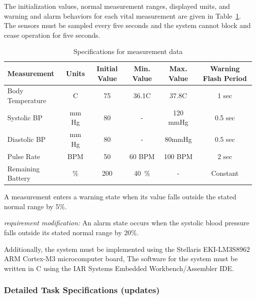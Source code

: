 \documentclass[12pt]{article} %
\begin{document}
The initialization values, normal measurement ranges, displayed units, and 
warning and alarm behaviors for each vital measurement are given in 
Table~\ref{tab:sensorDefs}. The sensors must be sampled every five seconds and the system cannot block and cease operation for five seconds.

\begin{table}[h]
  \centering
  \begin{tabular}{|l|*{5}{c}|}
    \hline
    Measurement & Units & Initial Value & Min. Value & Max. Value & Warning Flash Period \\ \hline
    Body Temperature & C & 75 & 36.1C & 37.8C & 1 sec \\ \hline
    Systolic BP & mm Hg & 80 & - & 120 mmHg & 0.5 sec \\ \hline
    Diastolic BP & mm Hg & 80 & - & 80mmHg & 0.5 sec \\ \hline
    Pulse Rate & BPM & 50 & 60 BPM & 100 BPM & 2 sec \\ \hline
    Remaining Battery & \% & 200 & 40~\% & - & Constant \\ \hline
  \end{tabular}
  \caption{Specifications for measurement data}
  \label{tab:sensorDefs}
\end{table}

A measurement enters a warning state when its value falls outside the stated 
normal range by 5\%. 

\emph{requirement modification: }An alarm state occurs when the systolic blood
pressure falls outside
its stated normal range by 20\%.	

Additionally, the system must be implemented using the Stellaris 
EKI-LM3S8962 ARM Cortex-M3 microcomputer board, The software for the system 
must be written in C using the IAR Systems Embedded Workbench/Assembler IDE.

\subsubsection{Detailed Task Specifications (updates)}
\end{document}
